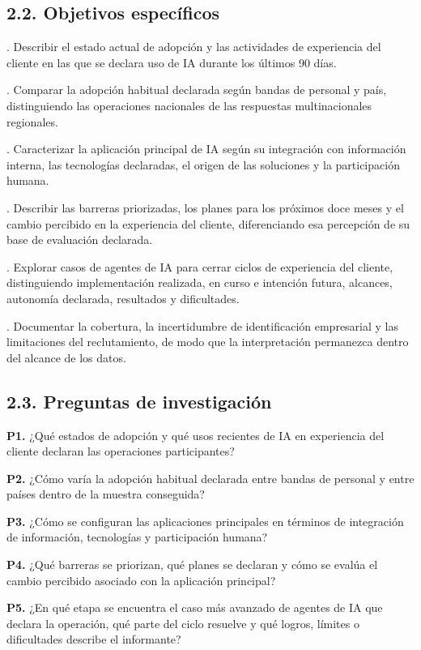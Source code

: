 \documentclass[12pt,letterpaper]{article}
\begin{document}
\subsection*{2.2. Objetivos específicos}
. Describir el estado actual de adopción y las actividades de experiencia del cliente en las que se declara uso de IA durante los últimos 90 días.\par
{}. Comparar la adopción habitual declarada según bandas de personal y país, distinguiendo las operaciones nacionales de las respuestas multinacionales regionales.\par
{}. Caracterizar la aplicación principal de IA según su integración con información interna, las tecnologías declaradas, el origen de las soluciones y la participación humana.\par
{}. Describir las barreras priorizadas, los planes para los próximos doce meses y el cambio percibido en la experiencia del cliente, diferenciando esa percepción de su base de evaluación declarada.\par
{}. Explorar casos de agentes de IA para cerrar ciclos de experiencia del cliente, distinguiendo implementación realizada, en curso e intención futura, alcances, autonomía declarada, resultados y dificultades.\par
{}. Documentar la cobertura, la incertidumbre de identificación empresarial y las limitaciones del reclutamiento, de modo que la interpretación permanezca dentro del alcance de los datos.\par
\subsection*{2.3. Preguntas de investigación}
\textbf{P1.} ¿Qué estados de adopción y qué usos recientes de IA en experiencia del cliente declaran las operaciones participantes?

\textbf{P2.} ¿Cómo varía la adopción habitual declarada entre bandas de personal y entre países dentro de la muestra conseguida?

\textbf{P3.} ¿Cómo se configuran las aplicaciones principales en términos de integración de información, tecnologías y participación humana?

\textbf{P4.} ¿Qué barreras se priorizan, qué planes se declaran y cómo se evalúa el cambio percibido asociado con la aplicación principal?

\textbf{P5.} ¿En qué etapa se encuentra el caso más avanzado de agentes de IA que declara la operación, qué parte del ciclo resuelve y qué logros, límites o dificultades describe el informante?
\end{document}
